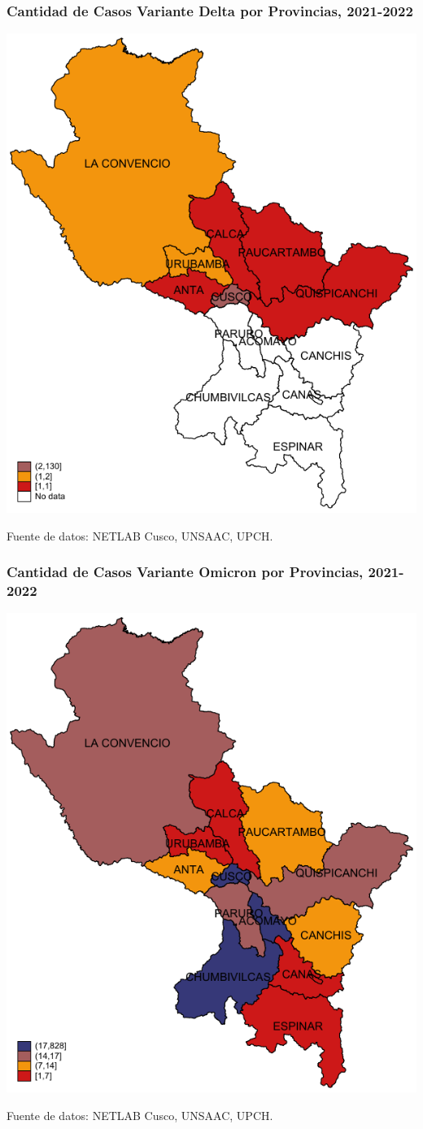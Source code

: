 \documentclass[xcolor=table]{beamer}
\begin{document}
	\begin{frame}[label=mapa_delta]
		\frametitle{Cantidad de Casos  Variante \textbf{Delta} por Provincias, 2021-2022}
		\begin{center}
			\includegraphics[width=0.55\linewidth]{../figuras/variantes_provincial_delta.pdf}
		\end{center}
		{\tiny Fuente de datos: NETLAB Cusco, UNSAAC, UPCH.}
		
		\hyperlink{mapa_variantes}{}
	\end{frame}

	\begin{frame}[label=mapa_omicron]
	\frametitle{Cantidad de Casos  Variante \textbf{Omicron} por Provincias, 2021-2022}
	\begin{center}
		\includegraphics[width=0.55\linewidth]{../figuras/variantes_provincial_omicron.pdf}
	\end{center}
	{\tiny Fuente de datos: NETLAB Cusco, UNSAAC, UPCH.}
	
	\hyperlink{mapa_variantes}{}
\end{frame}
\end{document}
